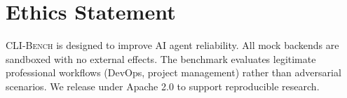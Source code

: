 \documentclass{article}
\newcommand{\clibench}{\textsc{CLI-Bench}}
\begin{document}
\section*{Ethics Statement}

\clibench{} is designed to improve AI agent reliability. All mock backends are sandboxed with no external effects. The benchmark evaluates legitimate professional workflows (DevOps, project management) rather than adversarial scenarios. We release under Apache 2.0 to support reproducible research.



\end{document}
